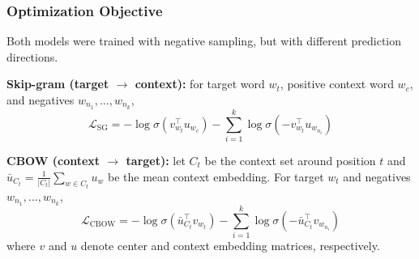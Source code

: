 \documentclass[11pt,a4paper]{article}
\begin{document}
\subsubsection{Optimization Objective}
Both models were trained with negative sampling, but with different prediction directions.

\textbf{Skip-gram (target $\rightarrow$ context):}
for target word $w_t$, positive context word $w_c$, and negatives $w_{n_1},...,w_{n_k}$,
\[
\mathcal{L}_{\text{SG}} = -\log\sigma(v_{w_t}^\top u_{w_c}) - \sum_{i=1}^{k}\log\sigma(-v_{w_t}^\top u_{w_{n_i}})
\]

\textbf{CBOW (context $\rightarrow$ target):}
let $C_t$ be the context set around position $t$ and
$\bar{u}_{C_t}=\frac{1}{|C_t|}\sum_{w\in C_t}u_w$ be the mean context embedding. For target $w_t$ and negatives $w_{n_1},...,w_{n_k}$,
\[
\mathcal{L}_{\text{CBOW}} = -\log\sigma(\bar{u}_{C_t}^\top v_{w_t}) - \sum_{i=1}^{k}\log\sigma(-\bar{u}_{C_t}^\top v_{w_{n_i}})
\]
where $v$ and $u$ denote center and context embedding matrices, respectively.


\end{document}
